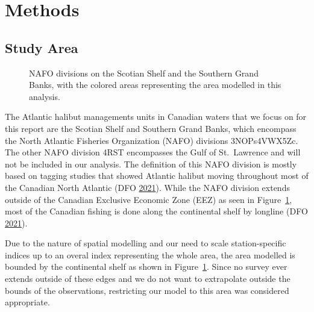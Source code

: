 \documentclass[12pt]{article}\usepackage[]{graphicx}\usepackage[]{color}
\begin{document}
\hypertarget{methods}{%
\section{Methods}\label{methods}}

\hypertarget{study-area}{%
\subsection{Study Area}\label{study-area}}
\begin{figure}[htb]

{\centering {} 

}

\caption{NAFO divisions on the Scotian Shelf and the Southern Grand Banks, with the colored areas representing the area modelled in this analysis.}\label{fig:nafo-strat}
\end{figure}
The Atlantic halibut managements units in Canadian waters that we focus on for this report are the Scotian Shelf and Southern Grand Banks, which encompass the North Atlantic Fisheries Organization (NAFO) divisions 3NOPs4VWX5Zc. The other NAFO division 4RST encompasses the Gulf of St.~Lawrence and will not be included in our analysis. The definition of this NAFO division is mostly based on tagging studies that showed Atlantic halibut moving throughout most of the Canadian North Atlantic (DFO \protect\hyperlink{ref-DFO2021}{2021}). While the NAFO division extends outside of the Canadian Exclusive Economic Zone (EEZ) as seen in Figure~\ref{fig:nafo-strat}, most of the Canadian fishing is done along the continental shelf by longline (DFO \protect\hyperlink{ref-DFO2021}{2021}).

Due to the nature of spatial modelling and our need to scale station-specific indices up to an overal index representing the whole area, the area modelled is bounded by the continental shelf as shown in Figure~\ref{fig:nafo-strat}. Since no survey ever extends outside of these edges and we do not want to extrapolate outside the bounds of the observations, restricting our model to this area was considered appropriate.
\end{document}
